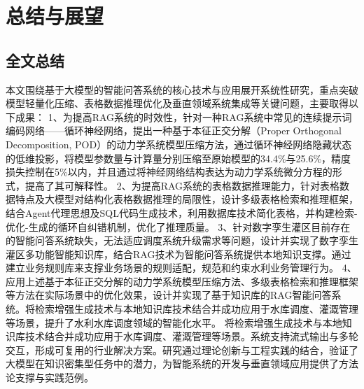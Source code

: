 \chapter{总结与展望}
\label{cha:第六章}
\section{全文总结}
本文围绕基于大模型的智能问答系统的核心技术与应用展开系统性研究，重点突破模型轻量化压缩、表格数据推理优化及垂直领域系统集成等关键问题，主要取得以下成果：    
1、为提高RAG系统的时效性，针对一种RAG系统中常见的连续提示词编码网络——循环神经网络，提出一种基于本征正交分解（Proper Orthogonal Decomposition, POD）的动力学系统模型压缩方法，通过循环神经网络隐藏状态的低维投影，将模型参数量与计算量分别压缩至原始模型的34.4\%与25.6\%，精度损失控制在5\%以内，并且通过将神经网络结构表达为动力学系统微分方程的形式，提高了其可解释性。
2、为提高RAG系统的表格数据推理能力，针对表格数据特点及大模型对结构化表格数据推理的局限性，设计多级表格检索和推理框架，结合Agent代理思想及SQL代码生成技术，利用数据库技术简化表格，并构建检索-优化-生成的循环自纠错机制，优化了推理质量。
3、针对数字孪生灌区目前存在的智能问答系统缺失，无法适应调度系统升级需求等问题，设计并实现了数字孪生灌区多功能智能知识库，结合RAG技术为智能问答系统提供本地知识支撑。通过建立业务规则库来支撑业务场景的规则适配，规范和约束水利业务管理行为。
4、应用上述基于本征正交分解的动力学系统模型压缩方法、多级表格检索和推理框架等方法在实际场景中的优化效果，设计并实现了基于知识库的RAG智能问答系统。将检索增强生成技术与本地知识库技术结合并成功应用于水库调度、灌溉管理等场景，提升了水利水库调度领域的智能化水平。
将检索增强生成技术与本地知识库技术结合并成功应用于水库调度、灌溉管理等场景。系统支持流式输出与多轮交互，形成可复用的行业解决方案。研究通过理论创新与工程实践的结合，验证了大模型在知识密集型任务中的潜力，为智能系统的开发与垂直领域应用提供了方法论支撑与实践范例。
